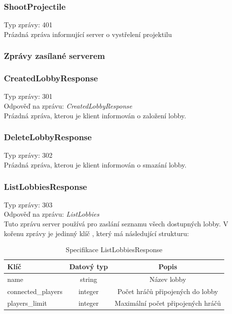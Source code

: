 \documentclass[12pt, a4paper]{article}
\begin{document}
    \subsubsection*{ShootProjectile}
    Typ zprávy: 401\\

    Prázdná zpráva informující server o vystřelení projektilu

    \subsubsection{Zprávy zasílané serverem}
    \subsubsection*{CreatedLobbyResponse}
    Typ zprávy: 301\\
    Odpověď na zprávu: \textit{CreatedLobbyResponse}\\

    Prázdná zpráva, kterou je klient informován o založení lobby.

    \subsubsection*{DeleteLobbyResponse}
    Typ zprávy: 302\\

    Prázdná zpráva, kterou je klient informován o smazání lobby.

    \subsubsection*{ListLobbiesResponse}
    Typ zprávy: 303\\
    Odpověď na zprávu: \textit{ListLobbies}\\

    Tuto zprávu server používá pro zaslání seznamu všech dostupných lobby.
    V kořenu zprávy je jedinný klíč , který má následující strukturu:

    \begin{table}[H]
        \centering
        \begin{tabular}{|l|c|c|}
            \hline
            Klíč & Datový typ & Popis\\
            \hline
            \hline
            name & string & Název lobby\\
            \hline
            connected\_players & integer & Počet hráčů připojených do lobby\\
            \hline
            players\_limit & integer & Maximální počet připojených hráčů\\
            \hline
        \end{tabular}
        \caption{Specifikace ListLobbiesResponse}
    \end{table}
\end{document}
